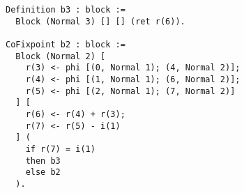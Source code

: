 \begin{figure}[ht]
\centering
\begin{minipage}{0.65\textwidth}


\begin{lstlisting}[style=Rocq]
Definition b3 : block :=
  Block (Normal 3) [] [] (ret r(6)).

CoFixpoint b2 : block :=
  Block (Normal 2) [
    r(3) <- phi [(0, Normal 1); (4, Normal 2)];
    r(4) <- phi [(1, Normal 1); (6, Normal 2)];
    r(5) <- phi [(2, Normal 1); (7, Normal 2)]
  ] [
    r(6) <- r(4) + r(3);
    r(7) <- r(5) - i(1)
  ] (
    if r(7) = i(1)
    then b3
    else b2
  ).


\end{lstlisting}
\end{minipage}
\end{figure}
